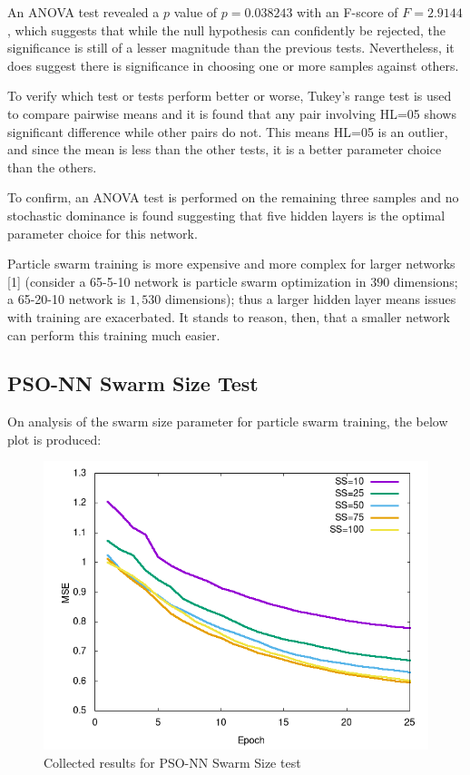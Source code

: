 \documentclass[a4paper,12pt]{article}
\begin{document}
An ANOVA test revealed a $p$ value of $p = 0.038243$ with an F-score of $F = 2.9144$, which suggests that while the null hypothesis can confidently be rejected, the significance is still of a lesser magnitude than the previous tests. Nevertheless, it does suggest there is significance in choosing one or more samples against others.

To verify which test or tests perform better or worse, Tukey's range test is used to compare pairwise means and it is found that any pair involving HL=05 shows significant difference while other pairs do not. This means HL=05 is an outlier, and since the mean is less than the other tests, it is a better parameter choice than the others.

To confirm, an ANOVA test is performed on the remaining three samples and no stochastic dominance is found suggesting that five hidden layers is the optimal parameter choice for this network.

Particle swarm training is more expensive and more complex for larger networks [1] (consider a 65-5-10 network is particle swarm optimization in $390$ dimensions; a 65-20-10 network is $1,530$ dimensions); thus a larger hidden layer means issues with training are exacerbated. It stands to reason, then, that a smaller network can perform this training much easier.

\pagebreak

\subsection{PSO-NN Swarm Size Test}

On analysis of the swarm size parameter for particle swarm training, the below plot is produced:

\begin{figure}[h!]
\centering
\includegraphics[scale=0.60]{images/pso-ss-plot.png}
\caption{Collected results for PSO-NN Swarm Size test}
\label{fig:pso-nn-ss}
\end{figure}
\end{document}

